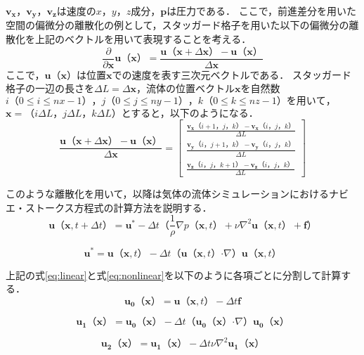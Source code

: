 \documentclass[a4j,12pt]{jreport}
\begin{document}
$\bm{v_x}$，$\bm{v_y}$，$\bm{v_z}$は速度の$x$，$y$，$z$成分，$\bm{p}$は圧力である．
ここで，前進差分を用いた空間の偏微分の離散化の例として，スタッガード格子を用いた以下の偏微分の離散化を上記のベクトルを用いて表現することを考える．
\[
\frac{\partial}{\partial \bm{x}}\bm{u} （\bm{x}） = \frac{\bm{u}（\bm{x}+\varDelta \bm{x}）  - \bm{u} （\bm{x}） }{\varDelta \bm{x}}
\]
ここで，$\bm{u} （\bm{x}）$は位置$\bm{x}$での速度を表す三次元ベクトルである．
スタッガード格子の一辺の長さを$\varDelta L = \varDelta \bm{x}$，流体の位置ベクトル$\bm{x}$を自然数$i（0 \le i \le nx-1），j（0 \le j \le ny-1），k（0 \le k \le nz-1）を用いて，$$\bm{x} = （i\varDelta L，j\varDelta L，k\varDelta L）$とすると，以下のようになる．
\[
\frac{\bm{u}（\bm{x}+\varDelta \bm{x}）  - \bm{u} （\bm{x}） }{\varDelta \bm{x}}
= \begin{bmatrix}
\frac{\bm{v_x}（i+1，j，k）  - \bm{v_x} （i，j，k） }{\varDelta L}\\
\frac{\bm{v_y}（i，j+1，k）  - \bm{v_y} （i，j，k） }{\varDelta L}\\
\frac{\bm{v_z}（i，j，k+1）  - \bm{v_z} （i，j，k） }{\varDelta L}
\end{bmatrix}
\]

このような離散化を用いて，以降は気体の流体シミュレーションにおけるナビエ・ストークス方程式の計算方法を説明する．
\begin{equation}\label{eq:linear}
	\bm{u} （\bm{x},t + \varDelta t）  =  \bm{u}^* - \varDelta t （\frac{1}{\rho}\nabla p （\bm{x},t）  + \nu\nabla^2\bm{u} （\bm{x},t）  + \bm{f}） 
\end{equation} 

\begin{equation}\label{eq:nonlinear}
	\bm{u}^* = \bm{u} （\bm{x},t）  - \varDelta t （\bm{u} （\bm{x},t）  \boldsymbol{\cdot}\nabla） \bm{u} （\bm{x},t）  
\end{equation}

上記の式\ref{eq:linear}と式\ref{eq:nonlinear}を以下のように各項ごとに分割して計算する．
\begin{equation}\label{eq:force}
	\bm{u_0（\bm{x}）} =  \bm{u} （\bm{x},t）  - \varDelta t \bm{f} 
\end{equation} 

\begin{equation}\label{eq:advect}
	\bm{u_1（\bm{x}）} = \bm{u_0（\bm{x}）}  - \varDelta t （\bm{u_0} （\bm{x}）  \boldsymbol{\cdot}\nabla） \bm{u_0} （\bm{x}）
\end{equation}

\begin{equation}\label{eq:diffusion}
	\bm{u_2（\bm{x}）}   =  \bm{u_1（\bm{x}）} - \varDelta t \nu\nabla^2\bm{u_1} （\bm{x}）
\end{equation}
\end{document}
